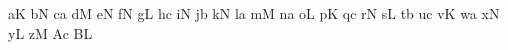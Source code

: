 \gregorianCclef
\Internote
\nosolesmescustos
\initiumgregorianum
\sgn {}a{}\punctum K\egn
\spatium
\sgn {}b{}\oriscus N\egn
\spatium
\sgn {}c{}\virga a\egn
\spatium
\sgn {}d{}\lvirga M\egn
\spatium
\sgn {}e{}\stropha N\egn
\spatium
\sgn {}f{}\quilisma N\egn
\spatium
\sgn {}g{}\quadratum L\egn
\spatium
\sgn {}h{}\punctuminclinatum c\egn
\spatium
\sgn {}i{}\punctumcavum N\egn
\spatium
\sgn {}j{}\lineapunctum b\egn
\spatium
\sgn {}k{}\lineapunctumcavum N\egn
\spatium
\sgn {}l{}\punctumreversum a\egn
\spatium
\sgn {}m{}\semipunctum M\egn
\spatium
\sgn {}n{}\punctumparvum a\egn
\spatium
\sgn {}o{}\distropha L\egn
\spatium
\sgn {}p{}\bivirga K\egn
\spatium
\sgn {}q{}\varbivirga c\egn
\spatium
\sgn {}r{}\tristropha N\egn
\spatium
\sgn {}s{}\trivirga L\egn
\spatium
\sgn {}t{}\vartrivirga b\egn
\spatium
\sgn {}u{}\oriscusreversus c\egn
\spatium
\sgn {}v{}\semipunctumreversum K\egn
\spatium
\sgn {}w{}\punctumreversumparvum a\egn
\spatium
\sgn {}x{}\punctuminclinatumauctum N\egn
\spatium
\sgn {}y{}\punctuminclinatumparvum L\egn
\spatium
\sgn {}z{}\punctumauctumdescendens M\egn
\spatium
\sgn {}A{}\punctumauctumascendens c\egn
\spatium
\sgn {}B{}\strophaaucta L\egn
\spatium
\finisaequalis

\bigskip

